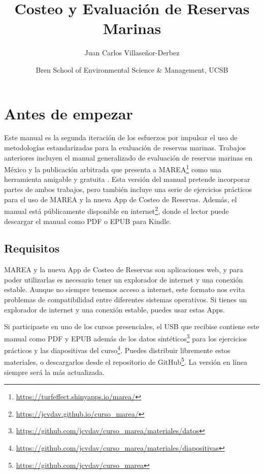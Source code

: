 \documentclass[]{book}
\title{Costeo y Evaluación de Reservas Marinas}
\author{Juan Carlos Villaseñor-Derbez}
\date{Bren School of Environmental Science \& Management, UCSB}
\renewcommand{\href}[2]{#2\footnote{\url{#1}}}
\begin{document}
\maketitle

{
\setcounter{tocdepth}{2}
\tableofcontents
}
\hypertarget{antes-de-empezar}{%
\chapter*{Antes de empezar}\label{antes-de-empezar}}


Este manual es la segunda iteración de los esfuerzos por impulsar el uso
de metodologías estandarizadas para la evaluación de reservas marinas.
Trabajos anteriores incluyen el manual generalizado de evaluación de
reservas marinas en México \citep{villaseorderbez_2017} y la publicación
arbitrada que presenta a
\href{https://turfeffect.shinyapps.io/marea/}{MAREA} como una
herramienta amigable y gratuita \citep{villasenorderbez_2018}. Esta
versión del manual pretende incorporar partes de ambos trabajos, pero
también incluye una serie de ejercicios prácticos para el uso de MAREA y
la nueva App de Costeo de Reservas. Además, el manual está públicamente
disponible en \href{https://jcvdav.github.io/curso_marea/}{internet},
donde el lector puede descargar el manual como PDF o EPUB para Kindle.

\hypertarget{requisitos}{%
\section{Requisitos}\label{requisitos}}

MAREA y la nueva App de Costeo de Reservas son aplicaciones web, y para
poder utilizarlas es necesario tener un explorador de internet y una
conexión estable. Aunque no siempre tenemos acceso a internet, este
formato nos evita problemas de compatibilidad entre diferentes sistemas
operativos. Si tienes un explorador de internet y una conexión estable,
puedes usar estas Apps.

Si participaste en uno de los cursos presenciales, el USB que recibise
contiene este manual como PDF y EPUB además de los
\href{https://github.com/jcvdav/curso_marea/materiales/datos}{datos
sintéticos} para los ejercicios prácticos y las
\href{https://github.com/jcvdav/curso_marea/materiales/diapositivas}{diapositivas
del curso}. Puedes distribuir libremente estos materiales, o
descargarlos desde el
\href{https://github.com/jcvdav/curso_marea}{repositorio de GitHub}. La
versión en línea siempre será la más actualizada.
\end{document}
